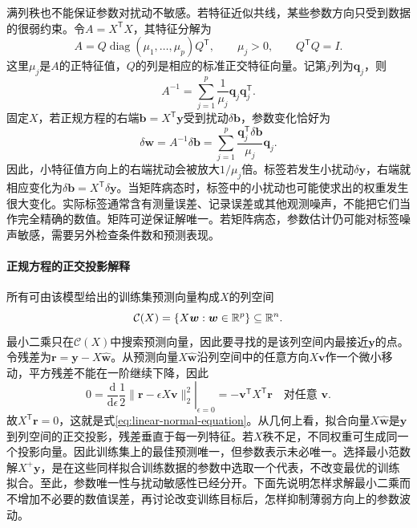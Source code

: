 满列秩也不能保证参数对扰动不敏感。若特征近似共线，某些参数方向只受到数据的很弱约束。令$A=X^{\mathsf T}X$，其特征分解为
\begin{equation}
 A=Q\operatorname{diag}(\mu_1,\ldots,\mu_p)Q^{\mathsf T},
 \qquad \mu_j>0,\qquad Q^{\mathsf T}Q=I.
\end{equation}
这里$\mu_j$是$A$的正特征值，$Q$的列是相应的标准正交特征向量。记第$j$列为$\bm q_j$，则
\begin{equation}
 A^{-1}=\sum_{j=1}^p\frac1{\mu_j}\bm q_j\bm q_j^{\mathsf T}.
\end{equation}
固定$X$，若正规方程的右端$\bm b=X^{\mathsf T}\bm y$受到扰动$\delta\bm b$，参数变化恰好为
\begin{equation}
 \delta\bm w=A^{-1}\delta\bm b
 =\sum_{j=1}^p\frac{\bm q_j^{\mathsf T}\delta\bm b}{\mu_j}\bm q_j.
 \label{eq:linear-ill-conditioned-perturbation}
\end{equation}
因此，小特征值方向上的右端扰动会被放大$1/\mu_j$倍。标签若发生小扰动$\delta\bm y$，右端就相应变化为$\delta\bm b=X^{\mathsf T}\delta\bm y$。当矩阵病态时，标签中的小扰动也可能使求出的权重发生很大变化。实际标签通常含有测量误差、记录误差或其他观测噪声，不能把它们当作完全精确的数值。矩阵可逆保证解唯一。若矩阵病态，参数估计仍可能对标签噪声敏感，需要另外检查条件数和预测表现。

\paragraph{正规方程的正交投影解释}
所有可由该模型给出的训练集预测向量构成$X$的列空间
\begin{equation}
 \mathcal C(X)=\{X\bm w:\bm w\in\mathbb{R}^p\}\subseteq\mathbb{R}^n.
\end{equation}
最小二乘只在$\mathcal C(X)$中搜索预测向量，因此要寻找的是该列空间内最接近$\bm y$的点。令残差为$\bm r=\bm y-X\hat{\bm w}$。从预测向量$X\hat{\bm w}$沿列空间中的任意方向$X\bm v$作一个微小移动，平方残差不能在一阶继续下降，因此
\begin{equation}
 0=\left.\frac{\mathrm d}{\mathrm d\epsilon}
 \frac12\|\bm r-\epsilon X\bm v\|_2^2\right|_{\epsilon=0}
 =-\bm v^{\mathsf T}X^{\mathsf T}\bm r
 \quad\text{对任意 }\bm v.
\end{equation}
故$X^{\mathsf T}\bm r=0$，这就是式\eqref{eq:linear-normal-equation}。从几何上看，拟合向量$X\hat{\bm w}$是$\bm y$到列空间的正交投影，残差垂直于每一列特征。若$X$秩不足，不同权重可生成同一个投影向量。因此训练集上的最佳预测唯一，但参数表示未必唯一。选择最小范数解$X^+\bm y$，是在这些同样拟合训练数据的参数中选取一个代表，不改变最优的训练拟合。至此，参数唯一性与扰动敏感性已经分开。下面先说明怎样求解最小二乘而不增加不必要的数值误差，再讨论改变训练目标后，怎样抑制薄弱方向上的参数波动。

